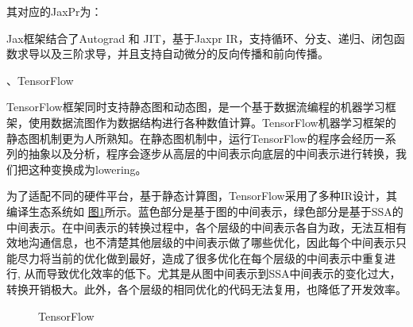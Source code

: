 \documentclass[letterpaper,10pt,english]{sphinxmanual}
\let\sphinxpxdimen\pdfpxdimen\else\newdimen\sphinxpxdimen
\begin{document}
\sphinxAtStartPar
其对应的JaxPr为：

\begin{sphinxVerbatim}[commandchars=\\\{\}]
   \PYG{p}{[}\PYG{p}{]} \PYG{p}{[}\PYG{p}{]} 
    \PYG{p}{[}\PYG{p}{]}   
    \PYG{p}{[}\PYG{p}{]}    
    \PYG{p}{[}\PYG{p}{]}    
    \PYG{p}{[}\PYG{p}{]}  \PYG{p}{[}\PYG{p}{]} 
    
\end{sphinxVerbatim}

\sphinxAtStartPar
Jax框架结合了Autograd 和 JIT，基于Jaxpr
IR，支持循环、分支、递归、闭包函数求导以及三阶求导，并且支持自动微分的反向传播和前向传播。

、TensorFlow

\sphinxAtStartPar
TensorFlow框架同时支持静态图和动态图，是一个基于数据流编程的机器学习框架，使用数据流图作为数据结构进行各种数值计算。TensorFlow机器学习框架的静态图机制更为人所熟知。在静态图机制中，运行TensorFlow的程序会经历一系列的抽象以及分析，程序会逐步从高层的中间表示向底层的中间表示进行转换，我们把这种变换成为lowering。

\sphinxAtStartPar
为了适配不同的硬件平台，基于静态计算图，TensorFlow采用了多种IR设计，其编译生态系统如
\hyperref[\detokenize{chapter_frontend_and_ir/intermediate_representation:tfir}]{图\ref{\detokenize{chapter_frontend_and_ir/intermediate_representation:tfir}}}所示。蓝色部分是基于图的中间表示，绿色部分是基于SSA的中间表示。在中间表示的转换过程中，各个层级的中间表示各自为政，无法互相有效地沟通信息，也不清楚其他层级的中间表示做了哪些优化，因此每个中间表示只能尽力将当前的优化做到最好，造成了很多优化在每个层级的中间表示中重复进行,
从而导致优化效率的低下。尤其是从图中间表示到SSA中间表示的变化过大，转换开销极大。此外，各个层级的相同优化的代码无法复用，也降低了开发效率。

\begin{figure}[H]
\centering
\capstart

\noindent\sphinxincludegraphics[width=1000\sphinxpxdimen]{{中间表示-MLIR}.png}
\caption{TensorFlow}\label{\detokenize{chapter_frontend_and_ir/intermediate_representation:id17}}\label{\detokenize{chapter_frontend_and_ir/intermediate_representation:tfir}}\end{figure}
\end{document}
